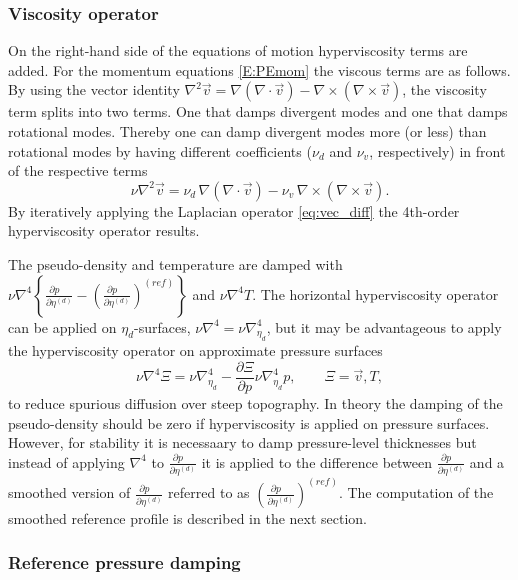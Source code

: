 \documentclass{agujournal}
\begin{document}
{\subsubsection{Viscosity operator}\label{sec:hyper}
On the right-hand side of the equations of motion hyperviscosity terms are added. For the momentum equations \eqref{E:PEmom} the viscous terms are as follows. By using the vector identity  $\nabla^2 \vec{v} = \nabla(\nabla \cdot \vec{v}) - \nabla \times (\nabla \times \vec{v}) $, the viscosity term splits into two terms. One that damps divergent modes and one that damps rotational modes. Thereby one can damp divergent modes more (or less) than rotational modes by having different coefficients ($\nu_d$ and $\nu_v$, respectively) in front of the respective terms
 \begin{equation}
  \nu \nabla^2 \vec{v} = \nu_d \, \nabla(\nabla \cdot \vec{v}) -
   \nu_v \,  \nabla \times (\nabla \times \vec{v}).\label{eq:vec_diff}
 \end{equation}
By iteratively applying the Laplacian operator \eqref{eq:vec_diff} the 4th-order hyperviscosity operator results.

The pseudo-density and temperature are damped with $\nu \nabla^4\left\{ \frac{\partial p\quad }{\partial \eta^{(d)}}-\left(\frac{\partial p\quad }{\partial \eta^{(d)}}\right)^{(ref)}\right\}$ and $\nu \nabla^4 T$. The horizontal hyperviscosity operator can be applied on $\eta_d$-surfaces, $\nu \nabla^4=\nu \nabla^4_{\eta_d}$, but it may be advantageous to apply the hyperviscosity operator on approximate pressure surfaces
\begin{equation}
\nu \nabla^4 \Xi =\nu \nabla^4_{\eta_d}-\frac{\partial \Xi}{\partial p}\nu \nabla^4_{\eta_d}p,\qquad \Xi=\vec{v}, T,
\end{equation}
\citep[p.58 in ][]{CAM5} to reduce spurious diffusion over steep topography. In theory the damping of the pseudo-density should be zero if hyperviscosity is applied on pressure surfaces. However, for stability it is necessaary to damp pressure-level thicknesses but instead of applying $\nabla^4$ to $\frac{\partial p\quad }{\partial \eta^{(d)}}$ it is applied to the difference between $\frac{\partial p\quad }{\partial \eta^{(d)}}$ and a smoothed version of $\frac{\partial p\quad }{\partial \eta^{(d)}}$ referred to as $\left( \frac{\partial p\quad }{\partial \eta^{(d)}}\right)^{(ref)}$. The computation of the smoothed reference profile is described in the next section.
\subsubsection{Reference pressure damping}
{\color{red}{Patrick}}
}
\end{document}
